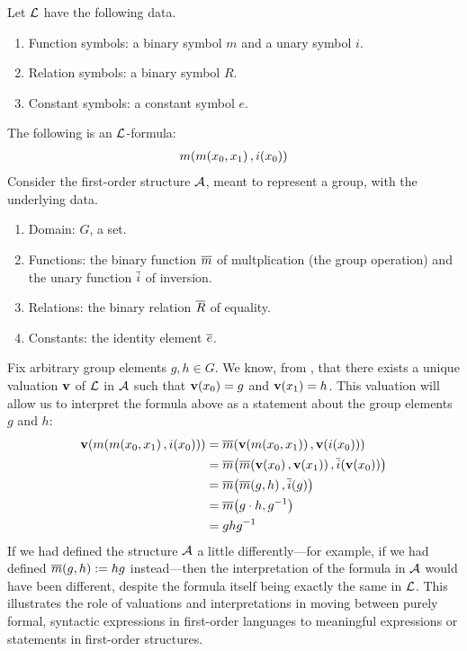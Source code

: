 \begin{boxexample}\label{Ch2:Eg:Language_and_Formula_for_Groups}
    Let $\mathcal{L}$ have the following data.
    \begin{enumerate}
        \item Function symbols: a binary symbol $m$ and a unary symbol $i$.
        \item Relation symbols: a binary symbol $R$.
        \item Constant symbols: a constant symbol $e$.
    \end{enumerate}
    The following is an $\mathcal{L}$-formula:
    \begin{align*}
        m\!\left( m\!\left( x_0, x_1 \right), i\!\left( x_0 \right) \right)
    \end{align*}
    Consider the first-order structure $\mathcal{A}$, meant to represent a group, with the underlying data.
    \begin{enumerate}
        \item Domain: $G$, a set.
        \item Functions: the binary function $\overline{m}$ of multplication (the group operation) and the unary function $\overline{i}$ of inversion.
        \item Relations: the binary relation $\overline{R}$ of equality.
        \item Constants: the identity element $\overline{e}$.
    \end{enumerate}
    Fix arbitrary group elements $g, h \in G$. We know, from , that there exists a unique valuation $\mathbf{v}$ of $\mathcal{L}$ in $\mathcal{A}$ such that $\mathbf{v}\!\left( x_0 \right) = g$ and $\mathbf{v}\!\left( x_1 \right) = h$. This valuation will allow us to interpret the formula above as a statement about the group elements $g$ and $h$:
    \begin{align*}
        \vof{m\of{m\of{x_0, x_1}, i\of{x_0}}}
        &= \ol{m}\of{\vof{m\of{x_0, x_1}}, \vof{i\of{x_0}}} \\
        &= \ol{m}\of{\ol{m}\of{\vof{x_0}, \vof{x_1}}, \ol{i}\of{\vof{x_0}}} \\
        &= \ol{m}\of{\ol{m}\of{g, h}, \ol{i}\of{g}} \\
        &= \ol{m}\of{g \cdot h, g\inv} \\
        &= ghg\inv
    \end{align*}
    If we had defined the structure $\mathcal{A}$ a little differently---for example, if we had defined $\overline{m}\!\left( g, h \right) := hg$ instead---then the interpretation of the formula in $\mathcal{A}$ would have been different, despite the formula itself being exactly the same in $\mathcal{L}$. This illustrates the role of valuations and interpretations in moving between purely formal, syntactic expressions in first-order languages to meaningful expressions or statements in first-order structures.
\end{boxexample}

